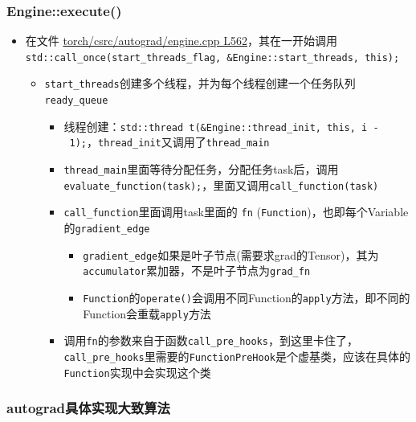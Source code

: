\hypertarget{engineexecute}{%
\subsubsection{Engine::execute()}\label{engineexecute}}

\begin{itemize}
\tightlist
\item
  在文件
  \href{https://github.com/pytorch/pytorch/blob/master/torch/csrc/autograd/engine.cpp\#L562}{torch/csrc/autograd/engine.cpp
  L562}，其在一开始调用\texttt{std::call\_once(start\_threads\_flag,\ \&Engine::start\_threads,\ this);}

  \begin{itemize}
  \tightlist
  \item
    \texttt{start\_threads}创建多个线程，并为每个线程创建一个任务队列\texttt{ready\_queue}

    \begin{itemize}
    \tightlist
    \item
      线程创建：\texttt{std::thread\ t(\&Engine::thread\_init,\ this,\ i\ -\ 1);}，\texttt{thread\_init}又调用了\texttt{thread\_main}
    \item
      \texttt{thread\_main}里面等待分配任务，分配任务task后，调用\texttt{evaluate\_function(task);}，里面又调用\texttt{call\_function(task)}
    \item
      \texttt{call\_function}里面调用task里面的 \texttt{fn}
      (\texttt{Function})，也即每个Variable的\texttt{gradient\_edge}

      \begin{itemize}
      \tightlist
      \item
        \texttt{gradient\_edge}如果是叶子节点(需要求grad的Tensor)，其为\texttt{accumulator}累加器，不是叶子节点为\texttt{grad\_fn}
      \item
        \texttt{Function}的\texttt{operate()}会调用不同Function的\texttt{apply}方法，即不同的Function会重载\texttt{apply}方法
      \end{itemize}
    \item
      调用\texttt{fn}的参数来自于函数\texttt{call\_pre\_hooks}，到这里卡住了，\texttt{call\_pre\_hooks}里需要的\texttt{FunctionPreHook}是个虚基类，应该在具体的\texttt{Function}实现中会实现这个类
    \end{itemize}
  \end{itemize}
\end{itemize}

\hypertarget{autogradux5177ux4f53ux5b9eux73b0ux5927ux81f4ux7b97ux6cd5}{%
\subsubsection{autograd具体实现大致算法}\label{autogradux5177ux4f53ux5b9eux73b0ux5927ux81f4ux7b97ux6cd5}}

